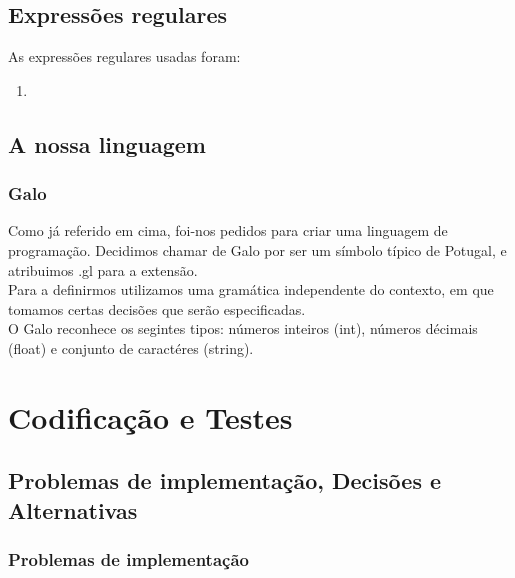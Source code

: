 \documentclass{report}
\begin{document}
\section{Expressões regulares} 
As expressões regulares usadas foram:

\begin{enumerate}[1)]
	\item

\end{enumerate}

\section{A nossa linguagem}
\subsection{Galo}
\indent
Como já referido em cima, foi-nos pedidos para criar uma linguagem de programação. Decidimos chamar de Galo por ser um símbolo típico de Potugal, e atribuimos .gl para a extensão.\\
\indent
Para a definirmos utilizamos uma gramática independente do contexto, em que tomamos certas decisões que serão especificadas.\\
\indent
O Galo reconhece os segintes tipos: números inteiros (int), números décimais  (float) e conjunto de caractéres (string).


\begin{code}
	

\end{code}


\chapter{Codificação e Testes}
\section{Problemas de implementação, Decisões e Alternativas}
\subsection{Problemas de implementação}

   
\end{document}
